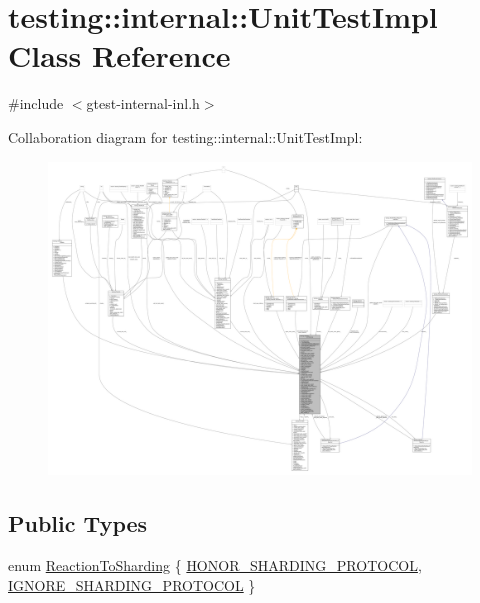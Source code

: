 \hypertarget{classtesting_1_1internal_1_1UnitTestImpl}{}\section{testing\+:\+:internal\+:\+:Unit\+Test\+Impl Class Reference}
\label{classtesting_1_1internal_1_1UnitTestImpl}


{\ttfamily \#include $<$gtest-\/internal-\/inl.\+h$>$}



Collaboration diagram for testing\+:\+:internal\+:\+:Unit\+Test\+Impl\+:
\nopagebreak
\begin{figure}[H]
\begin{center}
\leavevmode
\includegraphics[width=350pt]{classtesting_1_1internal_1_1UnitTestImpl__coll__graph}
\end{center}
\end{figure}
\subsection*{Public Types}
\begin{DoxyCompactItemize}
\item 
enum \hyperlink{classtesting_1_1internal_1_1UnitTestImpl_acc5ffd3f9bc2e87bb3dba4218f58af43}{Reaction\+To\+Sharding} \{ \hyperlink{classtesting_1_1internal_1_1UnitTestImpl_acc5ffd3f9bc2e87bb3dba4218f58af43abec11f1c4bb8a3e2b99fa8328bccd58c}{H\+O\+N\+O\+R\+\_\+\+S\+H\+A\+R\+D\+I\+N\+G\+\_\+\+P\+R\+O\+T\+O\+C\+OL}, 
\hyperlink{classtesting_1_1internal_1_1UnitTestImpl_acc5ffd3f9bc2e87bb3dba4218f58af43a68bd0b7e6a7bead14c93d1a42144095a}{I\+G\+N\+O\+R\+E\+\_\+\+S\+H\+A\+R\+D\+I\+N\+G\+\_\+\+P\+R\+O\+T\+O\+C\+OL}
 \}
\end{DoxyCompactItemize}
